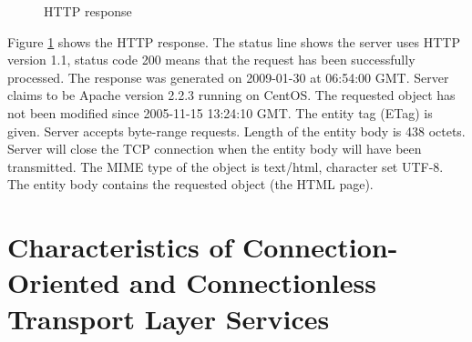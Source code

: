 \documentclass[10pt]{report}
\begin{document}
\begin{figure}[p]
    \centering
    \setlength\fboxsep{0pt}
    \setlength\fboxrule{0.5pt}
    \caption{HTTP response}
    \label{httpresponse}
\end{figure}

Figure \ref{httpresponse} shows the HTTP response.
The status line shows the server uses HTTP version 1.1, status code 200 means
that the request has been successfully processed.  The response was generated on
2009-01-30 at 06:54:00 GMT.  Server claims to be Apache version 2.2.3 running on
CentOS.  The requested object has not been modified since 2005-11-15 13:24:10
GMT.  The entity tag (ETag) is given.  Server accepts byte-range requests.
Length of the entity body is 438 octets.  Server will close the TCP connection
when the entity body will have been transmitted.  The MIME type of the object is
text/html, character set UTF-8.  The entity body contains the requested object
(the HTML page).


\chapter{Characteristics of Connection-Oriented and Connectionless Transport
	Layer Services}
\thispagestyle{fancy}
\end{document}
